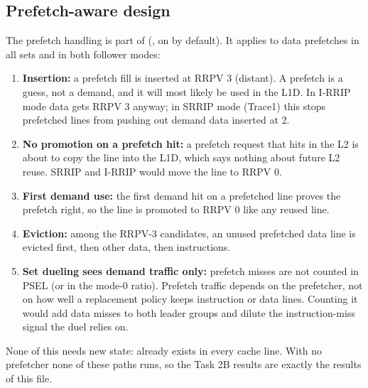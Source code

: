 \subsection{Prefetch-aware design}
The prefetch handling is part of  (, on by default). It
applies to data prefetches in all sets and in both follower modes:
\begin{enumerate}
  \item \textbf{Insertion:} a prefetch fill is inserted at RRPV 3 (distant). A prefetch is a guess, not a demand, and
        it will most likely be used in the L1D. In I-RRIP mode data gets RRPV 3 anyway; in SRRIP mode (Trace1) this
        stops prefetched lines from pushing out demand data inserted at 2.
  \item \textbf{No promotion on a prefetch hit:} a prefetch request that hits in the L2 is about to copy the line into
        the L1D, which says nothing about future L2 reuse. SRRIP and I-RRIP would move the line to RRPV 0.
  \item \textbf{First demand use:} the first demand hit on a prefetched line proves the prefetch right, so the line is
        promoted to RRPV 0 like any reused line.
  \item \textbf{Eviction:} among the RRPV-3 candidates, an unused prefetched data line is evicted first, then other
        data, then instructions.
  \item \textbf{Set dueling sees demand traffic only:} prefetch misses are not counted in PSEL (or in the mode-0 ratio).
        Prefetch traffic depends on the prefetcher, not on how well a replacement policy keeps instruction or data
        lines. Counting it would add data misses to both leader groups and dilute the instruction-miss signal the duel
        relies on.
\end{enumerate}
None of this needs new state:  already exists in every cache line. With no prefetcher none of
these paths runs, so the Task 2B results are exactly the results of this file.

